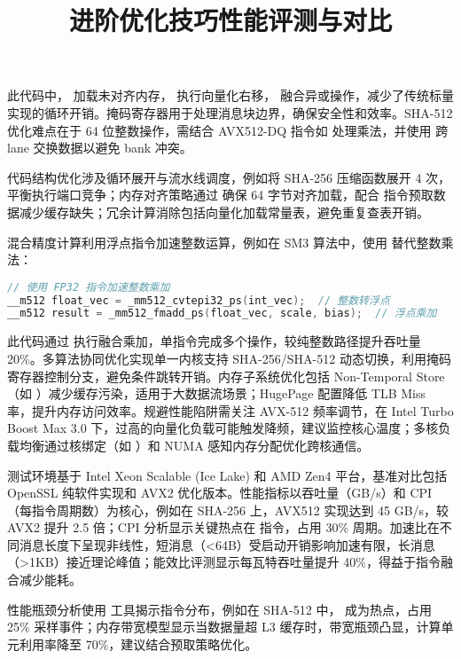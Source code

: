 此代码中， 加载未对齐内存， 执行向量化右移， 融合异或操作，减少了传统标量实现的循环开销。掩码寄存器用于处理消息块边界，确保安全性和效率。SHA-512 优化难点在于 64 位整数操作，需结合 AVX512-DQ 指令如  处理乘法，并使用  跨 lane 交换数据以避免 bank 冲突。\par
代码结构优化涉及循环展开与流水线调度，例如将 SHA-256 压缩函数展开 4 次，平衡执行端口竞争；内存对齐策略通过  确保 64 字节对齐加载，配合  指令预取数据减少缓存缺失；冗余计算消除包括向量化加载常量表，避免重复查表开销。\par
\title{进阶优化技巧}
混合精度计算利用浮点指令加速整数运算，例如在 SM3 算法中，使用  替代整数乘法：\par
\begin{lstlisting}[language=c]
// 使用 FP32 指令加速整数乘加
__m512 float_vec = _mm512_cvtepi32_ps(int_vec);  // 整数转浮点
__m512 result = _mm512_fmadd_ps(float_vec, scale, bias);  // 浮点乘加
\end{lstlisting}
此代码通过  执行融合乘加，单指令完成多个操作，较纯整数路径提升吞吐量 20\%{}。多算法协同优化实现单一内核支持 SHA-256/SHA-512 动态切换，利用掩码寄存器控制分支，避免条件跳转开销。内存子系统优化包括 Non-Temporal Store（如 ）减少缓存污染，适用于大数据流场景；HugePage 配置降低 TLB Miss 率，提升内存访问效率。规避性能陷阱需关注 AVX-512 频率调节，在 Intel Turbo Boost Max 3.0 下，过高的向量化负载可能触发降频，建议监控核心温度；多核负载均衡通过核绑定（如 ）和 NUMA 感知内存分配优化跨核通信。\par
\title{性能评测与对比}
测试环境基于 Intel Xeon Scalable (Ice Lake) 和 AMD Zen4 平台，基准对比包括 OpenSSL 纯软件实现和 AVX2 优化版本。性能指标以吞吐量（GB/s）和 CPI（每指令周期数）为核心，例如在 SHA-256 上，AVX512 实现达到 45 GB/s，较 AVX2 提升 2.5 倍；CPI 分析显示关键热点在  指令，占用 30\%{} 周期。加速比在不同消息长度下呈现非线性，短消息（<64B）受启动开销影响加速有限，长消息（>1KB）接近理论峰值；能效比评测显示每瓦特吞吐量提升 40\%{}，得益于指令融合减少能耗。\par
性能瓶颈分析使用  工具揭示指令分布，例如在 SHA-512 中， 成为热点，占用 25\%{} 采样事件；内存带宽模型显示当数据量超 L3 缓存时，带宽瓶颈凸显，计算单元利用率降至 70\%{}，建议结合预取策略优化。\par
